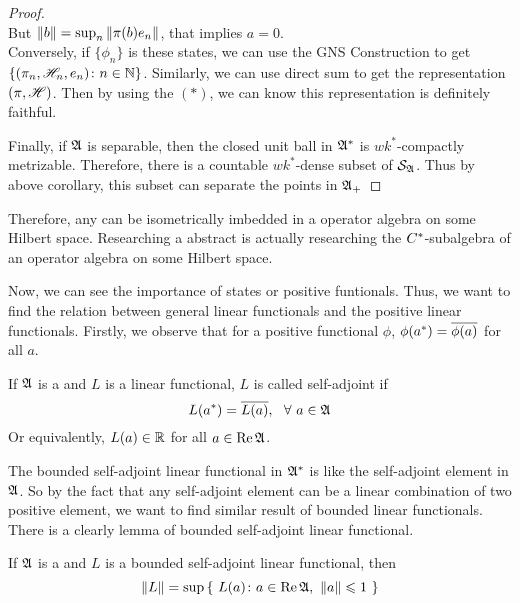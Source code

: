 \documentclass[a4paper,11pt]{report}
\begin{document}
\begin{proof}
\begin{equation}
	\end{equation}
	But $\left\lVert b\right\lVert = \sup_{n} \left\lVert\pi(b)e_n\right\lVert$, that implies $a = 0$.\\
	Conversely, if $\{\phi_n\}$ is these states, we can use the GNS Construction to get $\{(\pi_n,\mathscr{H}_n,e_n) \colon n \in \mathbb{N}\}$. Similarly, we can use direct sum to get the representation $(\pi,\mathscr{H})$. Then by using the $(*)$, we can know this representation is definitely faithful.
	\item Finally, if $\mathfrak{A}$ is separable, then the closed unit ball in $\mathfrak{A}^{*}$ is $wk^{*}$-compactly metrizable. Therefore, there is a countable $wk^{*}$-dense subset of $\mathcal{S}_{\mathfrak{A}}$. Thus by above corollary, this subset can separate the points in $\mathfrak{A}_{+}$
\end{proof}
\begin{rem}
	Therefore, any \Cs can be isometrically imbedded in a operator algebra on some Hilbert space. Researching a abstract \Cs is actually researching the $C^{*}$-subalgebra of an operator algebra on some Hilbert space.
\end{rem}

Now, we can see the importance of states or positive funtionals. Thus, we want to find the relation between general linear functionals and the positive linear functionals. Firstly, we observe that for a positive functional $\phi$, $\phi(a^{*})=\overline{\phi(a)}$ for all $a$. 
\begin{defn}
	If $\mathfrak{A}$ is a \Cs and $L$ is a linear functional, $L$ is called self-adjoint if 
	\begin{equation*}
		L(a^{*})=\overline{L(a)},~~ \forall~ a \in \mathfrak{A}
	\end{equation*}
	Or equivalently, $L(a) \in \mathbb{R}$ for all $a \in \operatorname{Re}{\mathfrak{A}}$.
\end{defn}

The bounded self-adjoint linear functional in $\mathfrak{A}^{*}$ is like the self-adjoint element in $\mathfrak{A}$. So by the fact that any self-adjoint element can be a linear combination of two positive element, we want to find similar result of bounded linear functionals. There is a clearly lemma of bounded self-adjoint linear functional.

\begin{lem}
	If $\mathfrak{A}$ is a \Cs and $L$ is a bounded self-adjoint linear functional, then
	\begin{equation*}
		\left\lVert L\right\lVert = \sup{\{~L(a) \colon a \in \operatorname{Re}{\mathfrak{A}},~\left\lVert a\right\lVert \leqslant 1~\}}
	\end{equation*}
\end{lem}
\end{document}
